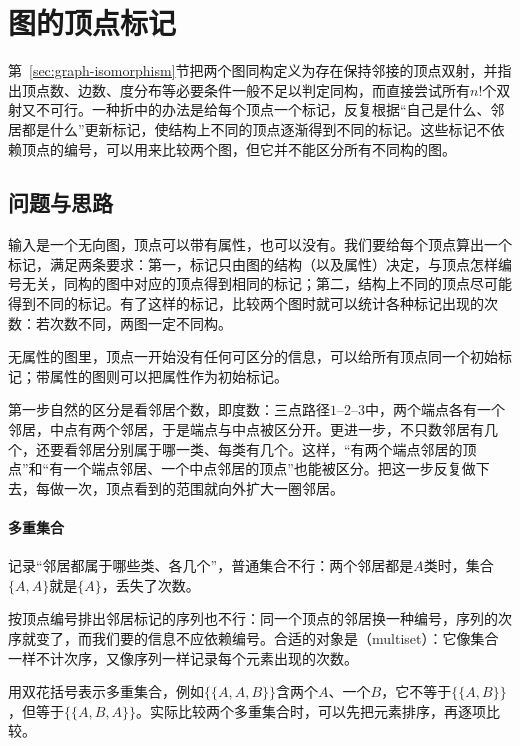 \section{图的顶点标记}
\label{sec:graph-wl-refinement}

第~\ref{sec:graph-isomorphism}节把两个图同构定义为存在保持邻接的顶点双射，并指出顶点数、边数、度分布等必要条件一般不足以判定同构，而直接尝试所有$n!$个双射又不可行。一种折中的办法是给每个顶点一个标记，反复根据“自己是什么、邻居都是什么”更新标记，使结构上不同的顶点逐渐得到不同的标记。这些标记不依赖顶点的编号，可以用来比较两个图，但它并不能区分所有不同构的图。

\subsection{问题与思路}
\label{sec:graph-trav-neighborhood-labels}

输入是一个无向图，顶点可以带有属性，也可以没有。我们要给每个顶点算出一个标记，满足两条要求：第一，标记只由图的结构（以及属性）决定，与顶点怎样编号无关，同构的图中对应的顶点得到相同的标记；第二，结构上不同的顶点尽可能得到不同的标记。有了这样的标记，比较两个图时就可以统计各种标记出现的次数：若次数不同，两图一定不同构。

无属性的图里，顶点一开始没有任何可区分的信息，可以给所有顶点同一个初始标记；带属性的图则可以把属性作为初始标记。

第一步自然的区分是看邻居个数，即度数：三点路径$1\text{--}2\text{--}3$中，两个端点各有一个邻居，中点有两个邻居，于是端点与中点被区分开。更进一步，不只数邻居有几个，还要看邻居分别属于哪一类、每类有几个。这样，“有两个端点邻居的顶点”和“有一个端点邻居、一个中点邻居的顶点”也能被区分。把这一步反复做下去，每做一次，顶点看到的范围就向外扩大一圈邻居。

\paragraph{多重集合}
记录“邻居都属于哪些类、各几个”，普通集合不行：两个邻居都是$A$类时，集合$\{A,A\}$就是$\{A\}$，丢失了次数。

按顶点编号排出邻居标记的序列也不行：同一个顶点的邻居换一种编号，序列的次序就变了，而我们要的信息不应依赖编号。合适的对象是（multiset）：它像集合一样不计次序，又像序列一样记录每个元素出现的次数。

用双花括号表示多重集合，例如$\{\!\{A,A,B\}\!\}$含两个$A$、一个$B$，它不等于$\{\!\{A,B\}\!\}$，但等于$\{\!\{A,B,A\}\!\}$。实际比较两个多重集合时，可以先把元素排序，再逐项比较。

